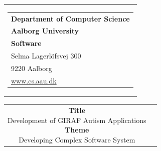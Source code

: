 


\thispagestyle{empty}

\begin{nopagebreak}
{
\samepage 
\begin{tabular}{r}
\parbox{\textwidth}
{
    \hfill \parbox{4.9cm}
    {
        \begin{tabular}{l}
            {\sf\small \textbf{Department of Computer Science}}\\
            {\sf\small \textbf{Aalborg University}}\\
            {\sf\small \textbf{Software}} \\
            {\sf\small Selma Lagerl\"{o}fsvej 300} \\
            {\sf\small 9220{  }Aalborg} \\
            {\sf\small \url{www.cs.aau.dk}}
        \end{tabular}
    }
}
\\
\end{tabular}

\begin{tabular}{cc}

    \parbox{8cm}
    {
        \textbf{Title} \\
        Development of GIRAF Autism Applications \\

        \textbf{Theme} \\ 
        Developing Complex Software System \\

}
\end{tabular}}
\end{nopagebreak}
